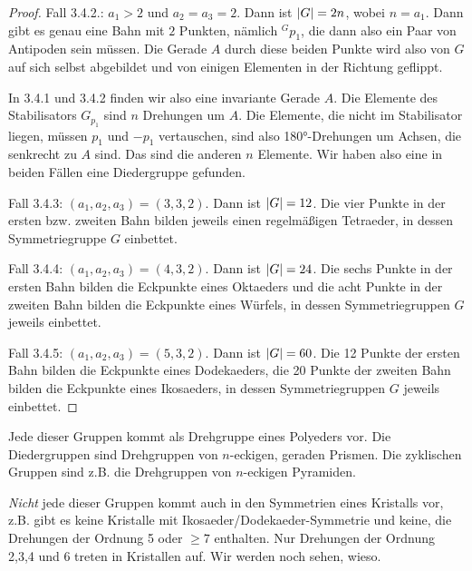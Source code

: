 \begin{proof}
Fall 3.4.2.: $a_1>2$ und $a_2=a_3=2$. Dann ist $\lvert G\rvert=2n$, wobei $n=a_1$. Dann gibt es genau eine Bahn mit $2$ Punkten, nämlich ${^Gp_1}$, die dann also ein Paar von Antipoden sein müssen. Die Gerade $A$ durch diese beiden Punkte wird also von $G$ auf sich selbst abgebildet und von einigen Elementen in der Richtung geflippt.

In 3.4.1 und 3.4.2 finden wir also eine invariante Gerade $A$. Die Elemente des Stabilisators $G_{p_1}$ sind $n$ Drehungen um $A$. Die Elemente, die nicht im Stabilisator liegen, müssen $p_1$ und $-p_1$ vertauschen, sind also 180°-Drehungen um Achsen, die senkrecht zu $A$ sind. Das sind die anderen $n$ Elemente. Wir haben also eine in beiden Fällen eine Diedergruppe gefunden.

Fall 3.4.3: $(a_1,a_2,a_3)=(3,3,2)$. Dann ist $\lvert G\rvert=12$. Die vier Punkte in der ersten bzw. zweiten Bahn bilden jeweils einen regelmäßigen Tetraeder, in dessen Symmetriegruppe $G$ einbettet.

Fall 3.4.4: $(a_1,a_2,a_3)=(4,3,2)$. Dann ist $\lvert G\rvert=24$. Die sechs Punkte in der ersten Bahn bilden die Eckpunkte eines Oktaeders und die acht Punkte in der zweiten Bahn bilden die Eckpunkte eines Würfels, in dessen Symmetriegruppen $G$ jeweils einbettet.

Fall 3.4.5: $(a_1,a_2,a_3)=(5,3,2)$. Dann ist $\lvert G\rvert=60$. Die 12 Punkte der ersten Bahn bilden die Eckpunkte eines Dodekaeders, die 20 Punkte der zweiten Bahn bilden die Eckpunkte eines Ikosaeders, in dessen Symmetriegruppen $G$ jeweils einbettet.
\end{proof}

\begin{remark}
Jede dieser Gruppen kommt als Drehgruppe eines Polyeders vor. Die Diedergruppen sind Drehgruppen von $n$-eckigen, geraden Prismen. Die zyklischen Gruppen sind z.B. die Drehgruppen von $n$-eckigen Pyramiden.
\end{remark}

\begin{remark}
\emph{Nicht} jede dieser Gruppen kommt auch in den Symmetrien eines Kristalls vor, z.B. gibt es keine Kristalle mit Ikosaeder/Dodekaeder-Symmetrie und keine, die Drehungen der Ordnung 5 oder $\geq 7$ enthalten. Nur Drehungen der Ordnung 2,3,4 und 6 treten in Kristallen auf. Wir werden noch sehen, wieso.
\end{remark}